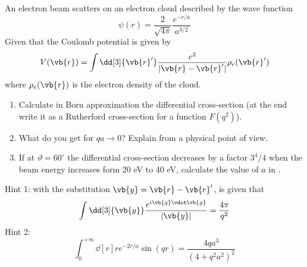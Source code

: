 \begin{esercizio}
   An electron beam scatters on an electron cloud described by the wave function
   \begin{equation*}
      \psi(r)
      =\frac{2}{\sqrt{4 \pi}} \frac{e^{-r/a}}{a^{3/2}}
   \end{equation*}
   Given that the Coulomb potential is given by
   \begin{equation*}
      V(\vb{r})
      =\int \dd[3]{\vb{r}'} \frac{e^2}{| \vb{r} - \vb{r}' |} \rho_e(\vb{r}')
   \end{equation*}
   where $\rho_e(\vb{r})$ is the electron density of the cloud.
   \begin{enumerate}[label=\alph*), leftmargin=0.6cm]
      \item Calculate in Born approximation the differential cross-section (at the end write it as a Rutherford cross-section for a function $F(q^2)$).
      \item What do you get for $qa \to 0$? Explain from a physical point of view.
      \item If at $\vartheta=60^{\circ}$ the differential cross-section decreases by a factor $3^4/4$ when the beam energy increases form 20 eV to 40 eV, calculate the value of $a$ in \A.
   \end{enumerate}
   Hint 1: with the substitution $\vb{y}=\vb{r} - \vb{r}'$, is given that
   \begin{equation*}
      \int \dd[3]{\vb{y}} \frac{e^{i \vb{q} \vdot \vb{y}}}{|\vb{y}|}
      =\frac{4 \pi}{q^2}
   \end{equation*}
   Hint 2:
   \begin{equation*}
      \int_{0}^{+\infty} \dd[r] r e^{-2r/a} \sin(qr)
      =\frac{4qa^3}{(4 + q^2a^2)^2}
   \end{equation*}
\end{esercizio}
